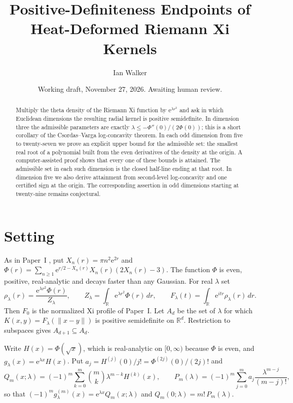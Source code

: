 \documentclass[11pt]{article}
\title{Positive-Definiteness Endpoints of\\ Heat-Deformed Riemann Xi Kernels}
\author{Ian Walker}
\date{Working draft, November 27, 2026. Awaiting human review.}
\theoremstyle{remark}
\newcommand{\R}{\mathbb{R}}
\newcommand{\ee}{\mathrm{e}}
\begin{document}
\maketitle

\begin{abstract}
Multiply the theta density of the Riemann Xi function by $\ee^{\lambda r^2}$ and ask in which
Euclidean dimensions the resulting radial kernel is positive semidefinite. In dimension three the
admissible parameters are exactly $\lambda\le-\Phi''(0)/(2\Phi(0))$; this is a short corollary of
the Csordas--Varga log-concavity theorem. In each odd dimension from five to twenty-seven we prove
an explicit upper bound for the admissible set: the smallest real root of a polynomial built from
the even derivatives of the density at the origin. A computer-assisted proof shows that every one of these bounds is attained.
The admissible set in each such dimension is the closed half-line ending at that root.
In dimension five we also derive attainment from second-level log-concavity and one certified sign at the origin.
The corresponding assertion in odd dimensions starting at twenty-nine remains conjectural.
\end{abstract}

\section{Setting}
As in Paper~I \cite{PaperI}, put $X_n(r)=\pi n^2\ee^{2r}$ and
$\Phi(r)=\sum_{n\ge1}\ee^{r/2-X_n(r)}X_n(r)(2X_n(r)-3)$. The function $\Phi$ is even, positive,
real-analytic and decays faster than any Gaussian. For real $\lambda$ set
\[
 \rho_\lambda(r)=\frac{\ee^{\lambda r^2}\Phi(r)}{Z_\lambda},\qquad
 Z_\lambda=\int_\R \ee^{\lambda r^2}\Phi(r)\,dr,\qquad
 F_\lambda(t)=\int_\R \ee^{itr}\rho_\lambda(r)\,dr .
\]
Then $F_0$ is the normalized Xi profile of Paper~I. Let $A_d$ be the set of $\lambda$ for which
$K(x,y)=F_\lambda(\lVert x-y\rVert)$ is positive semidefinite on $\R^d$. Restriction to subspaces
gives $A_{d+1}\subseteq A_d$.

Write $H(x)=\Phi(\sqrt{x})$, which is real-analytic on $[0,\infty)$ because $\Phi$ is even, and
$g_\lambda(x)=\ee^{\lambda x}H(x)$. Put $a_j=H^{(j)}(0)/j!=\Phi^{(2j)}(0)/(2j)!$ and
\[
 Q_m(x;\lambda)=(-1)^m\sum_{k=0}^{m}\binom{m}{k}\lambda^{m-k}H^{(k)}(x),\qquad
 P_m(\lambda)=(-1)^m\sum_{j=0}^{m}a_j\frac{\lambda^{m-j}}{(m-j)!},
\]
so that $(-1)^m g_\lambda^{(m)}(x)=\ee^{\lambda x}Q_m(x;\lambda)$ and $Q_m(0;\lambda)=m!\,P_m(\lambda)$.
\end{document}
